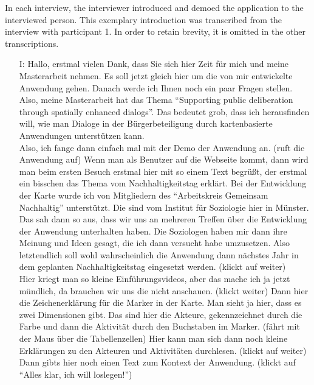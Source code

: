 \label{demo}
In each interview, the interviewer introduced and demoed the application to the interviewed person. This exemplary introduction was transcribed from the interview with participant 1. In order to retain brevity, it is omitted in the other transcriptions.

\begin{itemize}
\item[I:] Hallo, erstmal vielen Dank, dass Sie sich hier Zeit f{\"u}r mich und meine Masterarbeit nehmen. Es soll jetzt gleich hier um die von mir entwickelte Anwendung gehen. Danach werde ich Ihnen noch ein paar Fragen stellen. Also, meine Masterarbeit hat das Thema "`Supporting public deliberation through spatially enhanced dialogs"'. Das bedeutet grob, dass ich herausfinden will, wie man Dialoge in der B{\"u}rgerbeteiligung durch kartenbasierte Anwendungen unterst{\"u}tzen kann.\\
Also, ich fange dann einfach mal mit der Demo der Anwendung an. (ruft die Anwendung auf) Wenn man als Benutzer auf die Webseite kommt, dann wird man beim ersten Besuch erstmal hier mit so einem Text begr{\"u}{\ss}t, der erstmal ein bisschen das Thema vom Nachhaltigkeitstag erkl{\"a}rt. Bei der Entwicklung der Karte wurde ich von Mitgliedern des "`Arbeitskreis Gemeinsam Nachhaltig"' unterst{\"u}tzt. Die sind vom Institut f{\"u}r Soziologie hier in M{\"u}nster. Das sah dann so aus, dass wir uns an mehreren Treffen {\"u}ber die Entwicklung der Anwendung unterhalten haben. Die Soziologen haben mir dann ihre Meinung und Ideen gesagt, die ich dann versucht habe umzusetzen. Also letztendlich soll wohl wahrscheinlich die Anwendung dann n{\"a}chstes Jahr in dem geplanten Nachhaltigkeitstag eingesetzt werden. (klickt auf weiter)\\
Hier kriegt man so kleine Einf{\"u}hrungsvideos, aber das mache ich ja jetzt m{\"u}ndlich, da brauchen wir uns die nicht anschauen. (klickt weiter) Dann hier die Zeichenerkl{\"a}rung f{\"u}r die Marker in der Karte. Man sieht ja hier, dass es zwei Dimensionen gibt. Das sind hier die Akteure, gekennzeichnet durch die Farbe und dann die Aktivit{\"a}t durch den Buchstaben im Marker. (f{\"a}hrt mit der Maus {\"u}ber die Tabellenzellen) Hier kann man sich dann noch kleine Erkl{\"a}rungen zu den Akteuren und Aktivit{\"a}ten durchlesen. (klickt auf weiter) Dann gibts hier noch einen Text zum Kontext der Anwendung. (klickt auf "`Alles klar, ich will loslegen!"')\\

\end{itemize}
